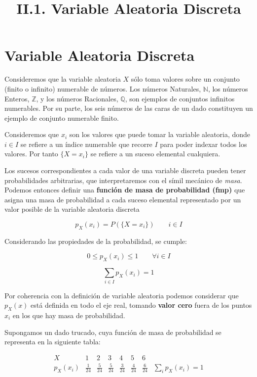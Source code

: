 \documentclass[11pt]{article}
\title{II.1. Variable Aleatoria Discreta}
\begin{document}
    
    
    \maketitle
    
    

    
    \hypertarget{ii.1-variable-aleatoria-discreta}{%
\section*{Variable Aleatoria
Discreta}\label{ii.1-variable-aleatoria-discreta}}

Consideremos que la variable aleatoria \(X\) sólo toma valores sobre un
conjunto (finito o infinito) numerable de números. Los números
Naturales, \(\mathbb{N}\), los números Enteros, \(\mathbb{Z}\), y los
números Racionales, \(\mathbb{Q}\), son ejemplos de conjuntos infinitos
numerables. Por su parte, los seis números de las caras de un dado
constituyen un ejemplo de conjunto numerable finito.

Consideremos que \(x_i\) son los valores que puede tomar la variable
aleatoria, donde \(i\in I\) se refiere a un índice numerable que recorre
\(I\) para poder indexar todos los valores. Por tanto \(\{X=x_i\}\) se
refiere a un suceso elemental cualquiera.

    Los sucesos correspondientes a cada valor de una variable discreta
pueden tener probabilidades arbitrarias, que interpretaremos con el
símil mecánico de \emph{masa}. Podemos entonces definir una
\textbf{función de masa de probabilidad (fmp)} que asigna una masa de
probabilidad a cada suceso elemental representado por un valor posible
de la variable aleatoria discreta

\[p_X(x_i)=P(\{X=x_i\})\qquad i \in I\]

Considerando las propiedades de la probabilidad, se cumple:

\[0\leq p_X(x_i)\leq 1 \qquad \forall i \in I\]

\[\sum_{i \in I} p_X(x_i)=1\]

Por coherencia con la definición de variable aleatoria podemos
considerar que \(p_X(x)\) está definida en todo el eje real, tomando
\textbf{valor cero} fuera de los puntos \(x_i\) en los que hay masa de
probabilidad.

    Supongamos un dado trucado, cuya función de masa de probabilidad se
representa en la siguiente tabla:

\[
\begin{array}{c|cccccc|c}
  X & 1 & 2 & 3 & 4 & 5 & 6 &  \\ 
  \hline
  p_X(x_i) & \frac{1}{24} & \frac{5}{24} & \frac{5}{24} & \frac{3}{24} & \frac{4}{24} & \frac{6}{24} & \sum_i p_X(x_i)=1
 \end{array}
\]
\end{document}
